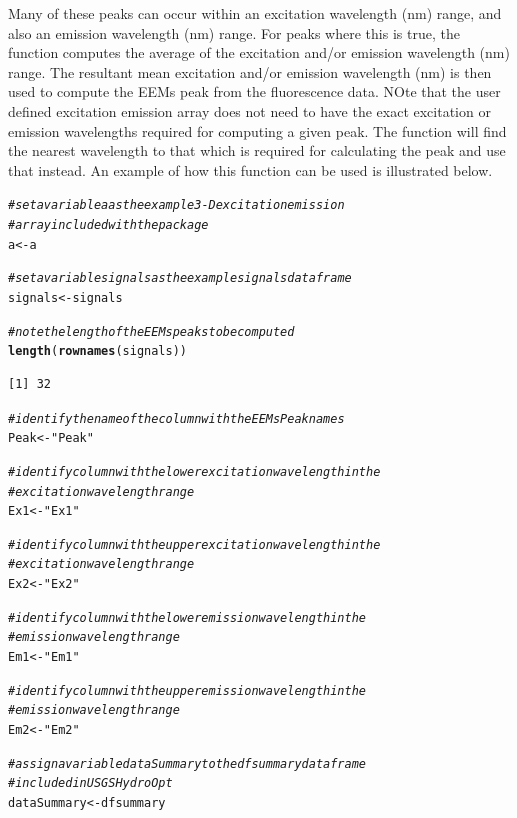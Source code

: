 \documentclass[a4paper,11pt]{article}\usepackage[]{graphicx}\usepackage[]{color}
\makeatletter
\newcommand{\hlstr}[1]{\textcolor[rgb]{0.192,0.494,0.8}{#1}}%
\newcommand{\hlcom}[1]{\textcolor[rgb]{0.678,0.584,0.686}{\textit{#1}}}%
\newcommand{\hlstd}[1]{\textcolor[rgb]{0.345,0.345,0.345}{#1}}%
\newcommand{\hlkwb}[1]{\textcolor[rgb]{0.69,0.353,0.396}{#1}}%
\newcommand{\hlkwd}[1]{\textcolor[rgb]{0.737,0.353,0.396}{\textbf{#1}}}%
\newenvironment{kframe}{%
 \def\at@end@of@kframe{}%
 \ifinner\ifhmode%
  \def\at@end@of@kframe{\end{minipage}}%
  \begin{minipage}{\columnwidth}%
 \fi\fi%
 \def\FrameCommand##1{\hskip\@totalleftmargin \hskip-\fboxsep
 \colorbox{shadecolor}{##1}\hskip-\fboxsep
     \hskip-\linewidth \hskip-\@totalleftmargin \hskip\columnwidth}%
 \MakeFramed {\advance\hsize-\width
   \@totalleftmargin\z@ \linewidth\hsize
   \@setminipage}}%
 {\par\unskip\endMakeFramed%
 \at@end@of@kframe}
\newenvironment{knitrout}{}{} %
\makeatother
\begin{document}
Many of these peaks can occur within an excitation wavelength (nm) range, and also an emission wavelength (nm) range. For peaks where this is true, the function computes the average of the excitation and/or emission wavelength (nm) range. The resultant mean excitation and/or emission wavelength (nm) is then used to compute the EEMs peak from the fluorescence data. NOte that the user defined excitation emission array does not need to have the exact excitation or emission wavelengths required for computing a given peak. The function will find the nearest wavelength to that which is required for calculating the peak and use that instead. An example of how this function can be used is illustrated below.

\begin{knitrout}
\color{fgcolor}\begin{kframe}
\begin{alltt}
\hlcom{# set a variable a as the example 3-D excitation emission}
\hlcom{# array included with the package}
\hlstd{a} \hlkwb{<-} \hlstd{a}

\hlcom{# set a variable signals as the example signals dataframe}
\hlstd{signals} \hlkwb{<-} \hlstd{signals}

\hlcom{# note the length of the EEMs peaks to be computed}
\hlkwd{length}\hlstd{(}\hlkwd{rownames}\hlstd{(signals))}
\end{alltt}
\begin{verbatim}
[1] 32
\end{verbatim}
\begin{alltt}
\hlcom{# identify the name of the column with the EEMs Peak names}
\hlstd{Peak} \hlkwb{<-} \hlstr{"Peak"}

\hlcom{# identify column with the lower excitation wavelength in the}
\hlcom{# excitation wavelength range}
\hlstd{Ex1} \hlkwb{<-} \hlstr{"Ex1"}

\hlcom{# identify column with the upper excitation wavelength in the}
\hlcom{# excitation wavelength range}
\hlstd{Ex2} \hlkwb{<-} \hlstr{"Ex2"}

\hlcom{# identify column with the lower emission wavelength in the}
\hlcom{# emission wavelength range}
\hlstd{Em1} \hlkwb{<-} \hlstr{"Em1"}

\hlcom{# identify column with the upper emission wavelength in the}
\hlcom{# emission wavelength range}
\hlstd{Em2} \hlkwb{<-} \hlstr{"Em2"}

\hlcom{# assign a variable dataSummary to the dfsummary dataframe}
\hlcom{# included in USGSHydroOpt}
\hlstd{dataSummary} \hlkwb{<-} \hlstd{dfsummary}


\end{alltt}
\end{kframe}
\end{knitrout}
\end{document}
